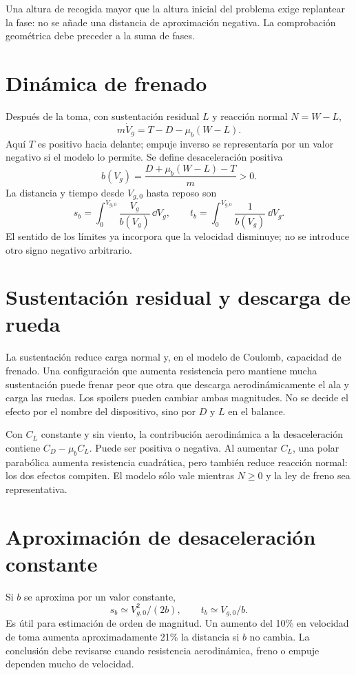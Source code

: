 Una altura de recogida mayor que la altura inicial del problema exige replantear la fase: no se añade una distancia de aproximación negativa. La comprobación geométrica debe preceder a la suma de fases.

\section{Dinámica de frenado}
Después de la toma, con sustentación residual $L$ y reacción normal $N=W-L$,
\begin{equation}
m\dot V_g=T-D-\mu_b(W-L).
\label{eq:landingbrake}
\end{equation}
Aquí $T$ es positivo hacia delante; empuje inverso se representaría por un valor negativo si el modelo lo permite. Se define desaceleración positiva
\begin{equation}
b(V_g)=\frac{D+\mu_b(W-L)-T}{m}>0.
\end{equation}
La distancia y tiempo desde $V_{g,0}$ hasta reposo son
\begin{equation}
s_b=\int_0^{V_{g,0}}\frac{V_g}{b(V_g)}\,\dd V_g,
\qquad t_b=\int_0^{V_{g,0}}\frac{1}{b(V_g)}\,\dd V_g.
\end{equation}
El sentido de los límites ya incorpora que la velocidad disminuye; no se introduce otro signo negativo arbitrario.

\section{Sustentación residual y descarga de rueda}
La sustentación reduce carga normal y, en el modelo de Coulomb, capacidad de frenado. Una configuración que aumenta resistencia pero mantiene mucha sustentación puede frenar peor que otra que descarga aerodinámicamente el ala y carga las ruedas. Los spoilers pueden cambiar ambas magnitudes. No se decide el efecto por el nombre del dispositivo, sino por $D$ y $L$ en el balance.

Con $C_L$ constante y sin viento, la contribución aerodinámica a la desaceleración contiene $C_D-\mu_bC_L$. Puede ser positiva o negativa. Al aumentar $C_L$, una polar parabólica aumenta resistencia cuadrática, pero también reduce reacción normal: los dos efectos compiten. El modelo sólo vale mientras $N\geq0$ y la ley de freno sea representativa.

\section{Aproximación de desaceleración constante}
Si $b$ se aproxima por un valor constante,
\begin{equation}
s_b\simeq V_{g,0}^2/(2b),\qquad t_b\simeq V_{g,0}/b.
\end{equation}
Es útil para estimación de orden de magnitud. Un aumento del 10\% en velocidad de toma aumenta aproximadamente 21\% la distancia si $b$ no cambia. La conclusión debe revisarse cuando resistencia aerodinámica, freno o empuje dependen mucho de velocidad.

